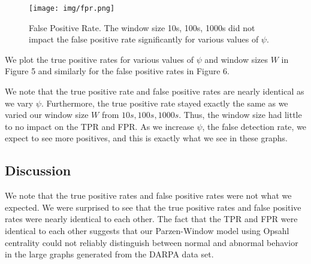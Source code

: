 \documentclass[10pt,twocolumn]{article}
\begin{document}
\noindent
\begin{figure}
  \label{fpr}
  \centering
    \texttt{[image: img/fpr.png]}
    \caption{False Positive Rate. The window size 10s, 100s, 1000s did not impact the false positive rate significantly for various values of $\psi$.} 
\end{figure}

We plot the true positive rates for various values of $\psi$ and window sizes $W$ in Figure 5 and similarly for the false positive rates in Figure 6.

We note that the true positive rate and false positive rates are nearly identical as we vary $\psi$. Furthermore, the true positive rate stayed exactly the same as we varied our window size $W$ from $10s, 100s, 1000s$. Thus, the window size had little to no impact on the TPR and FPR. As we increase $\psi$, the false detection rate, we expect to see more positives, and this is exactly what we see in these graphs.

\subsection{Discussion}

We note that the true positive rates and false positive rates were not what we expected. We were surprised to see that the true positive rates and false positive rates were nearly identical to each other. The fact that the TPR and FPR were identical to each other suggests that our Parzen-Window model using Opsahl centrality could not reliably distinguish between normal and abnormal behavior in the large graphs generated from the DARPA data set. 
\end{document}

